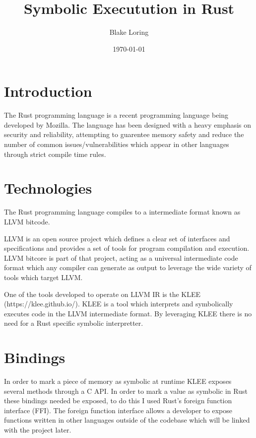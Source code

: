 \documentclass{report}
\begin{document}
\usepackage{listings}

\title{Symbolic Executution in Rust}
\author{Blake Loring}
\date{\today}

\maketitle

\chapter {Introduction}

The Rust programming language is a recent programming language being developed by Mozilla. The language has been designed with a heavy emphasis on security and reliability, attempting to guarentee memory safety and reduce the number of common issues/vulnerabilities which appear in other languages through strict compile time rules.

\chapter {Technologies}

The Rust programming language compiles to a intermediate format known as LLVM bitcode.

LLVM is an open source project which defines a clear set of interfaces and specifications and provides a set of tools for program compilation and execution. LLVM bitcore is part of that project, acting as a universal intermediate code format which any compiler can generate as output to leverage the wide variety of tools which target LLVM.

One of the tools developed to operate on LLVM IR is the KLEE (https://klee.github.io/). KLEE is a tool which interprets and symbolically executes code in the LLVM intermediate format. By leveraging KLEE there is no need for a Rust specific symbolic interpretter.

\chapter {Bindings}

In order to mark a piece of memory as symbolic at runtime KLEE exposes several methods through a C API. In order to mark a value as symbolic in Rust these bindings needed be exposed, to do this I used Rust's foreign function interface (FFI). The foreign function interface allows a developer to expose functions written in other languages outside of the codebase which will be linked with the project later.
\end{document}
